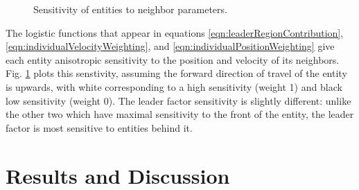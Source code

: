 \documentclass[conference]{IEEEtran}
\begin{document}
\begin{figure}[htbp]
{        \hspace*{0.15\columnwidth}
    }
    \par
    \caption{Sensitivity of entities to neighbor parameters.}
    \label{fig:logisticSensitivities}
\end{figure}

The logistic functions that appear in equations \ref{eqn:leaderRegionContribution}, \ref{eqn:individualVelocityWeighting}, and \ref{eqn:individualPositionWeighting} give each entity anisotropic sensitivity to the position and velocity of its neighbors.
Fig. \ref{fig:logisticSensitivities} plots this senstivity, assuming the forward direction of travel of the entity is upwards, with white corresponding to a high sensitivity (weight 1) and black low sensitivity (weight 0).
The leader factor sensitivity is slightly different: unlike the other two which have maximal sensitivity to the front of the entity, the leader factor is most sensitive to entities behind it.

\section{Results and Discussion}
\end{document}
